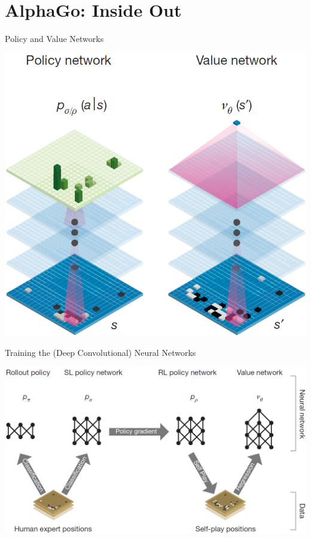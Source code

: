 \documentclass{beamer}
\begin{document}
  \section{AlphaGo: Inside Out}
  {
    \begin{frame}{Policy and Value Networks}
      \begin{center}
        \includegraphics[height=.85\textheight]{../img/policy_and_value_network.png}
      \end{center}
    \end{frame}

    \begin{frame}{Training the (Deep Convolutional) Neural Networks}
      \begin{center}
        \includegraphics[width=\textwidth]{../img/neural_nets_pipeline.png}
      \end{center}
    \end{frame}

}
\end{document}
